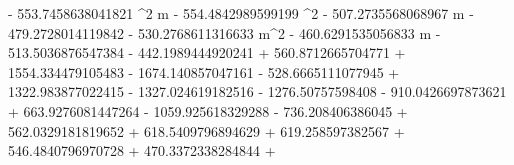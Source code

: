 - 553.7458638041821 \Delta^{2} m - 554.4842989599199 \Delta^{2} - 507.2735568068967 \Delta m - 479.2728014119842 \Delta - 530.2768611316633 m^{2} - 460.6291535056833 m - 513.5036876547384 \log{\left(\Delta + 1 \right)} - 442.1989444920241 \sin{\left(4 \Delta \right)} + 560.8712665704771 \sin{\left(5 \Delta \right)} + 1554.334479105483 \sin{\left(6 \Delta \right)} - 1674.140857047161 \sin{\left(7 \Delta \right)} - 528.6665111077945  + 1322.983877022415  - 1327.024619182516  - 1276.50757598408 \cos{\left(3 \Delta \right)} - 910.0426697873621 \cos{\left(4 \Delta \right)} + 663.9276081447264 \cos{\left(5 \Delta \right)} - 1059.925618329288  - 736.208406386045  + 562.0329181819652  + 618.5409796894629  + 619.258597382567  + 546.4840796970728  + 470.3372338284844  + 
